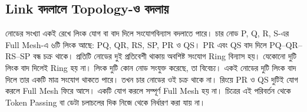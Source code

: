 \subsection{Link বদলালে Topology-ও বদলায়}
\label{ch2:c09-09}
নোডের সংখ্যা একই রেখে লিংক যোগ বা বাদ দিলে সংযোগবিন্যাস বদলাতে পারে। চার নোড P, Q, R, S-এর Full Mesh-এ ৬টি লিংক আছে: PQ, QR, RS, SP, PR ও QS। PR এবং QS বাদ দিলে PQ–QR–RS–SP বন্ধ চক্র থাকে। প্রতিটি নোডের দুই প্রতিবেশী থাকায় অবশিষ্ট সংযোগ Ring বিন্যাস হয়।
যেকোনো দুটি লিংক বাদ দিলেই Ring হয় না। লিংক দুটি কোন নোড সংযুক্ত করেছে, তা বিবেচ্য। একই নোডের দুটি লিংক বাদ দিলে তার একটি মাত্র সংযোগ থাকতে পারে। তখন চার নোডের ওই চক্র থাকে না। রিংয়ে PR ও QS দুটিই যোগ করলে Full Mesh ফিরে আসে। একটি যোগ করলে সম্পূর্ণ Full Mesh হয় না। চিত্রের এই পরিবর্তন থেকে Token Passing বা ডেটা চলাচলের দিক নিজে থেকে নির্ধারণ করা যায় না।
